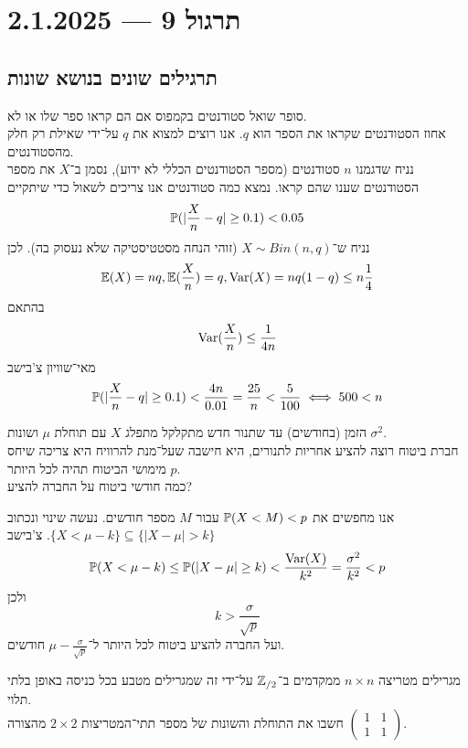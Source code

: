 \section{תרגול 9 --- 2.1.2025}
\subsection{תרגילים שונים בנושא שונות}
\begin{example}
	סופר שואל סטודנטים בקמפוס אם הם קראו ספר שלו או לא. \\
	אחוז הסטודנטים שקראו את הספר הוא $q$.
	אנו רוצים למצוא את $q$ על־ידי שאילת רק חלק מהסטודנטים. \\
	נניח שדגמנו $n$ סטודנטים (מספר הסטודנטים הכללי לא ידוע), נסמן ב־$X$ את מספר הסטודנטים שענו שהם קראו.
	נמצא כמה סטודנטים אנו צריכים לשאול כדי שיתקיים
	\[
		\mathbb{P}(| \frac{X}{n} - q| \ge 0.1) < 0.05
	\]
	נניח ש־$X \sim Bin(n, q)$ (זוהי הנחה מסטטיסטיקה שלא נעסוק בה).
	לכן
	\[
		\mathbb{E}(X) = nq,
		\mathbb{E}(\frac{X}{n}) = q,
		\operatorname{Var}(X) = nq(1 - q) \le n \frac{1}{4}
	\]
	בהתאם
	\[
		\operatorname{Var}(\frac{X}{n}) \le \frac{1}{4n}
	\]
	מאי־שוויון צ'בישב
	\[
		\mathbb{P}(|\frac{X}{n} - q| \ge 0.1) <\frac{4n}{0.01} = \frac{25}{n} < \frac{5}{100}
		\iff 500 < n
	\]
\end{example}
\begin{exercise}
	הזמן (בחודשים) עד שתנור חדש מתקלקל מתפלג $X$ עם תוחלת $\mu$ ושונות $\sigma^2$. \\
	חברת ביטוח רוצה להציע אחריות לתנורים, היא חישבה שעל־מנת להרוויח היא צריכה שיחס מימושי הביטוח תהיה לכל היותר $p$. \\
	כמה חודשי ביטוח על החברה להציע?
\end{exercise}
\begin{solution}
	אנו מחפשים את $\mathbb{P}(X < M) < p$ עבור $M$ מספר חודשים. נעשה שינוי ונכתוב $\{X < \mu - k\} \subseteq \{ |X - \mu| > k \}$.
	צ'בישב
	\[
		\mathbb{P}(X < \mu - k)
		\le \mathbb{P}(|X - \mu| \ge k)
		< \frac{\operatorname{Var}(X)}{k^2}
		= \frac{\sigma^2}{k^2}
		< p
	\]
	ולכן
	\[
		k > \frac{\sigma}{\sqrt{p}}
	\]
	ועל החברה להציע ביטוח לכל היותר ל־$\mu - \frac{\sigma}{\sqrt{p}}$ חודשים.
\end{solution}
\begin{exercise}
	מגרילים מטריצה $n \times n$ ממקדמים ב־$\mathbb{Z}_{/2}$ על־ידי זה שמגרילים מטבע בכל כניסה באופן בלתי תלוי. \\
	חשבו את התוחלת והשונות של מספר תתי־המטריצות $2 \times 2$ מהצורה $\begin{pmatrix} 1 & 1 \\ 1 & 1 \end{pmatrix}$.
\end{exercise}

